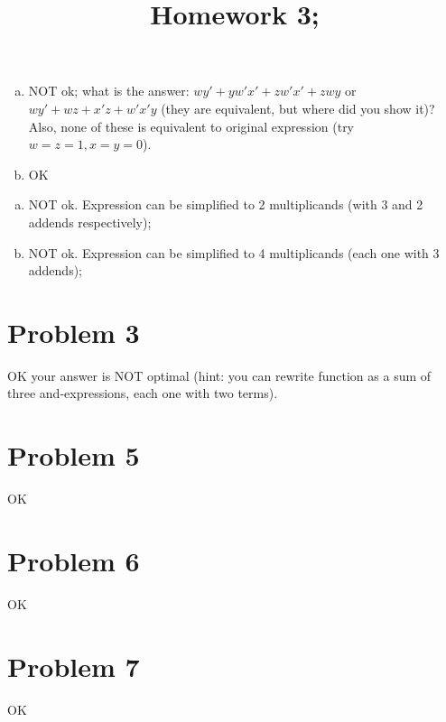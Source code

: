 \documentclass[10pt]{article} %
\title{Homework 3;
}
\begin{document}
\maketitle

\begin{enumerate}[(a)]
  \item NOT ok;
    what is the answer: $wy'+yw'x'+zw'x'+zwy$ or $wy'+wz+x'z+w'x'y$ (they are equivalent, but 
    where did you show it)?
    Also, none of these is equivalent to original expression (try $w=z=1,x=y=0$).
  \item OK
\end{enumerate}
\begin{enumerate}[(a)]
  \item NOT ok. Expression can be simplified to 2 multiplicands (with 3 and 2 addends respectively);
  \item NOT ok. Expression can be simplified to 4 multiplicands (each one with 3 addends);
\end{enumerate}
\section*{Problem 3 }
OK
your answer is NOT optimal 
(hint: you can rewrite function as a sum of three and-expressions, each
one with two terms).
\section*{Problem 5 }
OK
\section*{Problem 6 }
OK
\section*{Problem 7 }
OK
\end{document}
